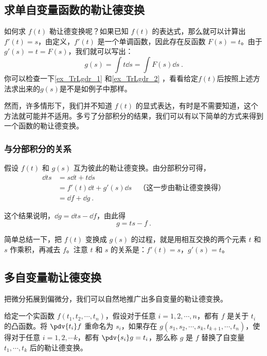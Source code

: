 \subsection{求单自变量函数的勒让德变换}



如何求 $f(t)$ 勒让德变换呢？如果已知 $f(t)$ 的表达式，那么就可以计算出 $f'(t)=s$，由定义，$f'(t)$ 是一个单调函数，因此存在反函数 $F(s)=t$。由于 $g'(s)=t=F(s)$，我们就可以写出：
\begin{equation}
g(s)=\int t \dd{s}=\int F(s) \dd{s}~.
\end{equation}
你可以检查一下\autoref{ex_TrLgdr_1} 和\autoref{ex_TrLgdr_2} ，看看给定$f(t)$后按照上述方法求出来的$g(s)$是不是如例子中那样。

然而，许多情形下，我们并不知道 $f(t)$ 的显式表达，有时是不需要知道，这个方法就可能并不适用。多亏了分部积分的结果，我们可以有以下简单的方式来得到一个函数的勒让德变换。


\subsubsection{与分部积分的关系}

假设 $f(t)$ 和 $g(s)$ 互为彼此的勒让德变换。由分部积分可得，
\begin{equation}
\begin{aligned}
\dd{ts}&=s\dd{t}+t\dd{s}\\&=f'(t)\dd{t}+g'(s)\dd{s}\quad\text{（这一步由勒让德变换得）}\\&=\dd{f}+\dd{g}~.
\end{aligned}
\end{equation}

这个结果说明，$\dd{g}=\dd{ts}-\dd{f}$，由此得
\begin{equation}
g=ts-f~.
\end{equation}

简单总结一下，把 $f(t)$ 变换成 $g(s)$ 的过程，就是用相互交换的两个元素 $t$ 和 $s$ 作乘积，再减去 $f$。注意 $t$ 和 $s$ 的关系是：$f'(t)=s$，$g'(s)=t$。

\subsection{多自变量勒让德变换}

把微分拓展到偏微分，我们可以自然地推广出多自变量的勒让德变换。

\begin{definition}{}\label{def_TrLgdr_1}
给定一个实函数 $f(t_1, t_2, \cdots, t_n)$，假设对于任意 $i=1, 2, \cdots, n$，都有 $f$ 是关于 $t_i$ 的凸函数。将 $\pdv{t_i}f$ 重命名为 $s_i$，如果存在 $g(s_1, s_2, \cdots, s_k, t_{k+1},\cdots, t_n)$，使得对于任意 $i=1,2,\cdots k$，都有 $\pdv{s_i}g=t_i$，那么称 $g$ 是 $f$ 替换了自变量 $t_1, \cdots, t_k$ 后的勒让德变换。
\end{definition}

